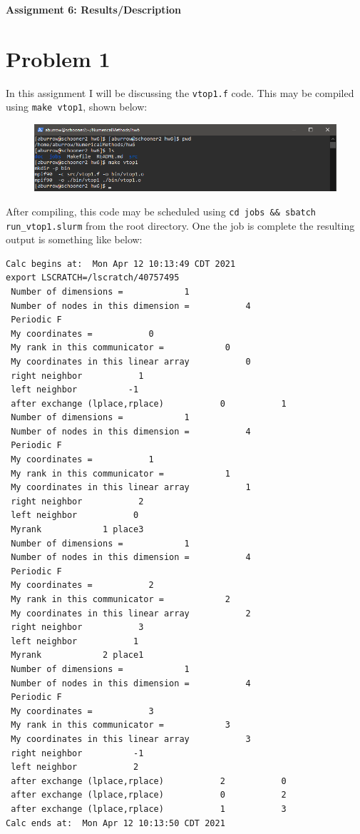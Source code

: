 \documentclass[12pt]{article}
\begin{document}
\begin{center}\begin{LARGE}
\textbf{Assignment 6: Results/Description}
\end{LARGE}\end{center}

\section*{Problem 1}

In this assignment I will be discussing the \texttt{vtop1.f} code. This may be
compiled using \texttt{make vtop1}, shown below:
\begin{figure}[H]
    \centering
    \includegraphics[width=1\textwidth]{compile}
    \label{fig:compile}
\end{figure}
After compiling, this code may be scheduled using \texttt{cd jobs \&\& sbatch
run\_vtop1.slurm} from the root directory. One the job is complete the
resulting output is something like below:
\begin{verbatim}
Calc begins at:  Mon Apr 12 10:13:49 CDT 2021
export LSCRATCH=/lscratch/40757495
 Number of dimensions =            1
 Number of nodes in this dimension =           4
 Periodic F
 My coordinates =           0
 My rank in this communicator =            0
 My coordinates in this linear array           0
 right neighbor           1
 left neighbor          -1
 after exchange (lplace,rplace)           0           1
 Number of dimensions =            1
 Number of nodes in this dimension =           4
 Periodic F
 My coordinates =           1
 My rank in this communicator =            1
 My coordinates in this linear array           1
 right neighbor           2
 left neighbor           0
 Myrank            1 place3
 Number of dimensions =            1
 Number of nodes in this dimension =           4
 Periodic F
 My coordinates =           2
 My rank in this communicator =            2
 My coordinates in this linear array           2
 right neighbor           3
 left neighbor           1
 Myrank            2 place1
 Number of dimensions =            1
 Number of nodes in this dimension =           4
 Periodic F
 My coordinates =           3
 My rank in this communicator =            3
 My coordinates in this linear array           3
 right neighbor          -1
 left neighbor           2
 after exchange (lplace,rplace)           2           0
 after exchange (lplace,rplace)           0           2
 after exchange (lplace,rplace)           1           3
Calc ends at:  Mon Apr 12 10:13:50 CDT 2021
\end{verbatim}
\end{document}
